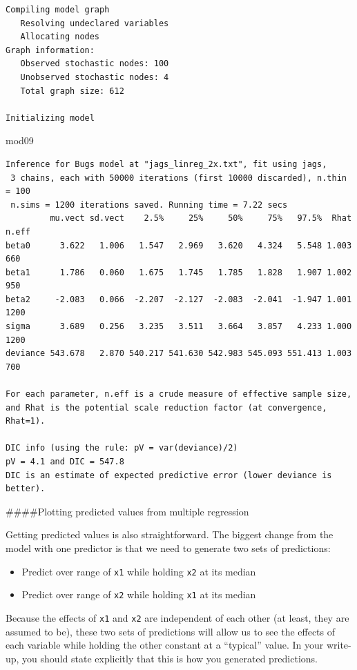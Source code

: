 \documentclass[
  13,
  letterpaper,
]{report}
\newenvironment{Shaded}{\begin{snugshade}}{\end{snugshade}}
\newcommand{\NormalTok}[1]{\textcolor[rgb]{0.00,0.23,0.31}{#1}}
\providecommand{\tightlist}{%
  \setlength{\itemsep}{0pt}\setlength{\parskip}{0pt}}
\begin{document}
\begin{verbatim}
Compiling model graph
   Resolving undeclared variables
   Allocating nodes
Graph information:
   Observed stochastic nodes: 100
   Unobserved stochastic nodes: 4
   Total graph size: 612

Initializing model
\end{verbatim}

\begin{Shaded}
\begin{Highlighting}[]
\NormalTok{mod09}
\end{Highlighting}
\end{Shaded}

\begin{verbatim}
Inference for Bugs model at "jags_linreg_2x.txt", fit using jags,
 3 chains, each with 50000 iterations (first 10000 discarded), n.thin = 100
 n.sims = 1200 iterations saved. Running time = 7.22 secs
         mu.vect sd.vect    2.5%     25%     50%     75%   97.5%  Rhat n.eff
beta0      3.622   1.006   1.547   2.969   3.620   4.324   5.548 1.003   660
beta1      1.786   0.060   1.675   1.745   1.785   1.828   1.907 1.002   950
beta2     -2.083   0.066  -2.207  -2.127  -2.083  -2.041  -1.947 1.001  1200
sigma      3.689   0.256   3.235   3.511   3.664   3.857   4.233 1.000  1200
deviance 543.678   2.870 540.217 541.630 542.983 545.093 551.413 1.003   700

For each parameter, n.eff is a crude measure of effective sample size,
and Rhat is the potential scale reduction factor (at convergence, Rhat=1).

DIC info (using the rule: pV = var(deviance)/2)
pV = 4.1 and DIC = 547.8
DIC is an estimate of expected predictive error (lower deviance is better).
\end{verbatim}

\#\#\#\#Plotting predicted values from multiple regression

Getting predicted values is also straightforward. The biggest change
from the model with one predictor is that we need to generate two sets
of predictions:

\begin{itemize}
\tightlist
\item
  Predict over range of \texttt{x1} while holding \texttt{x2} at its
  median
\item
  Predict over range of \texttt{x2} while holding \texttt{x1} at its
  median
\end{itemize}

Because the effects of \texttt{x1} and \texttt{x2} are independent of
each other (at least, they are assumed to be), these two sets of
predictions will allow us to see the effects of each variable while
holding the other constant at a ``typical'' value. In your write-up, you
should state explicitly that this is how you generated predictions.
\end{document}
